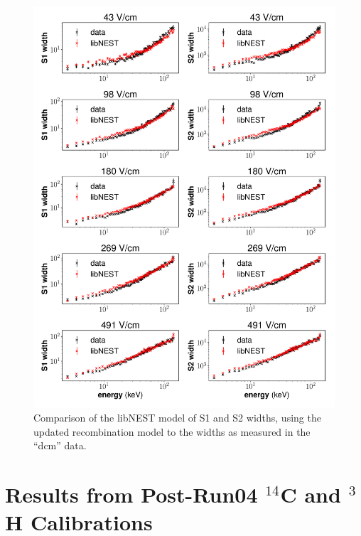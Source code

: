 \begin{figure}[h!]
\centering
  \includegraphics[width=\textwidth]{Figures/sigR_fieldvar_dcm.pdf}
\caption{Comparison of the libNEST model of S1 and S2 widths, using the updated recombination model to the widths as measured in the ``dcm'' data. }
\label{fig:sigR_fieldvar_dcm}
\end{figure}

\clearpage

\section{Results from Post-Run04 $^{14}$C and $^{3}$H Calibrations}\label{sec:finalresults}
